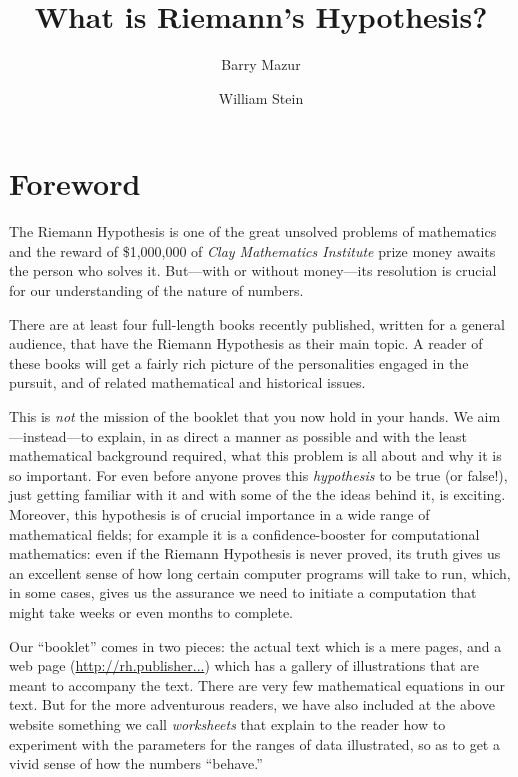 \documentclass[11pt]{article}
\title{What is Riemann's Hypothesis?}
\author{Barry Mazur \and William Stein}
\theoremstyle{plain}
\theoremstyle{definition}
\numberwithin{equation}{section}
\numberwithin{figure}{section}
\numberwithin{table}{section}
\begin{document}
\maketitle
\tableofcontents

\section{\label{foreword}Foreword}

\bigskip

The Riemann Hypothesis is one of the great unsolved problems of
mathematics and the reward of \$1,000,000 of {\em Clay Mathematics
  Institute} prize money awaits the person who solves it. But---with
or without money---its resolution is crucial for our understanding of
the nature of numbers.

There are at least four full-length books recently published, written
for a general audience, that have the Riemann Hypothesis as their main
topic.  A reader of these books will get a fairly rich picture of the
personalities engaged in the pursuit, and of related mathematical and
historical issues.
     
This is {\em not} the mission of the booklet that you now hold in your
hands. We aim---instead---to explain, in as direct a manner as
possible and with the least mathematical background required, what
this problem is all about and why it is so important. For even before
anyone proves this {\em hypothesis} to be true (or false!), just
getting familiar with it and with some of the the ideas behind it, is
exciting.  Moreover, this hypothesis is of crucial importance in a
wide range of mathematical fields; for example it is a
confidence-booster for computational mathematics: even if the Riemann
Hypothesis is never proved, its truth gives us an excellent sense of
how long certain computer programs will take to run, which, in some
cases, gives us the assurance we need to initiate a computation that
might take weeks or even months to complete.

      
Our ``booklet'' comes in two pieces: the actual text which is a mere
\pageref{lastpage} pages, and a web page (\url{http://rh.publisher...}) 
which has a gallery of illustrations that
are meant to accompany the text.  There are very few mathematical
equations in our text.  But for the more adventurous readers, we have
also included at the above website something we call {\em worksheets}
that explain to the reader how to experiment with the parameters for
the ranges of data illustrated, so as to get a vivid sense of how the
numbers ``behave.''
 
\end{document}
